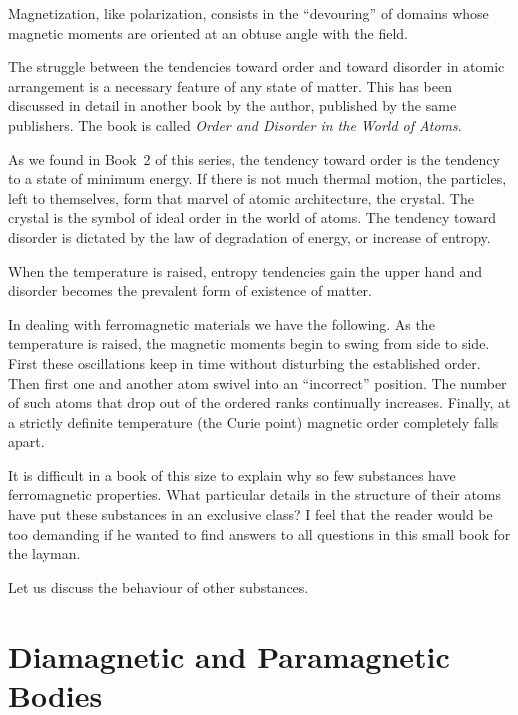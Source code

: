 Magnetization, like polarization, consists in the ``devouring'' of domains whose magnetic moments are oriented at an obtuse angle with the field.

The struggle between the tendencies toward order and toward disorder in atomic arrangement is a necessary feature of any state of matter. This has been discussed in detail in another book by the author, published by the same publishers. The book is called \emph{Order and Disorder in the World of Atoms}.

As we found in Book~2 of this series, the tendency toward order is the tendency to a state of minimum energy. If there is not much thermal motion, the particles, left to themselves, form that marvel of atomic architecture, the crystal. The crystal is the symbol of ideal order in the world of atoms. The tendency toward disorder is dictated by the law of degradation of energy, or increase of entropy.

When the temperature is raised, entropy tendencies gain the upper hand and disorder becomes the prevalent form of existence of matter.

In dealing with ferromagnetic materials we have the following. As the temperature is raised, the magnetic moments begin to swing from side to side. First these oscillations keep in time without disturbing the established order. Then first one and another atom swivel into an ``incorrect'' position. The number of such atoms that drop out of the ordered ranks continually increases. Finally, at a strictly definite temperature (the Curie point) magnetic order completely falls apart.

It is difficult in a book of this size to explain why so few substances have ferromagnetic properties. What particular details in the structure of their atoms have put these substances in an exclusive class? I feel that the reader would be too demanding if he wanted to find answers to all questions in this small book for the layman.

Let us discuss the behaviour of other substances.

\section{Diamagnetic and Paramagnetic Bodies}

